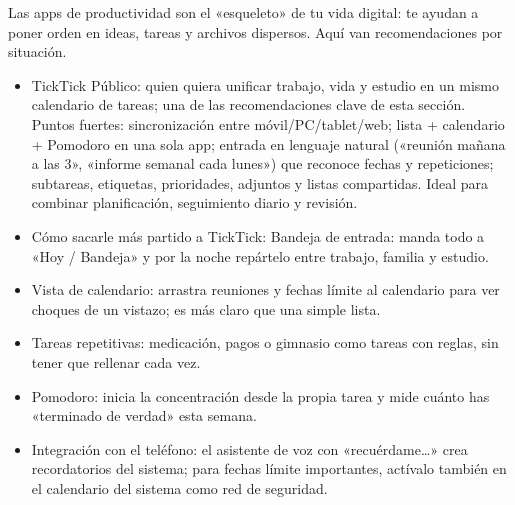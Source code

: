 


Las apps de productividad son el «esqueleto» de tu vida digital: te ayudan a poner orden en ideas, tareas y archivos dispersos. Aquí van recomendaciones por situación.


\begin{itemize}
  \item TickTick Público: quien quiera unificar trabajo, vida y estudio en un mismo calendario de tareas; una de las recomendaciones clave de esta sección. Puntos fuertes: sincronización entre móvil/PC/tablet/web; lista + calendario + Pomodoro en una sola app; entrada en lenguaje natural («reunión mañana a las 3», «informe semanal cada lunes») que reconoce fechas y repeticiones; subtareas, etiquetas, prioridades, adjuntos y listas compartidas. Ideal para combinar planificación, seguimiento diario y revisión.
  \item Cómo sacarle más partido a TickTick: Bandeja de entrada: manda todo a «Hoy / Bandeja» y por la noche repártelo entre trabajo, familia y estudio.
  \item Vista de calendario: arrastra reuniones y fechas límite al calendario para ver choques de un vistazo; es más claro que una simple lista.
  \item Tareas repetitivas: medicación, pagos o gimnasio como tareas con reglas, sin tener que rellenar cada vez.
  \item Pomodoro: inicia la concentración desde la propia tarea y mide cuánto has «terminado de verdad» esta semana.
  \item Integración con el teléfono: el asistente de voz con «recuérdame…» crea recordatorios del sistema; para fechas límite importantes, actívalo también en el calendario del sistema como red de seguridad.
\end{itemize}

